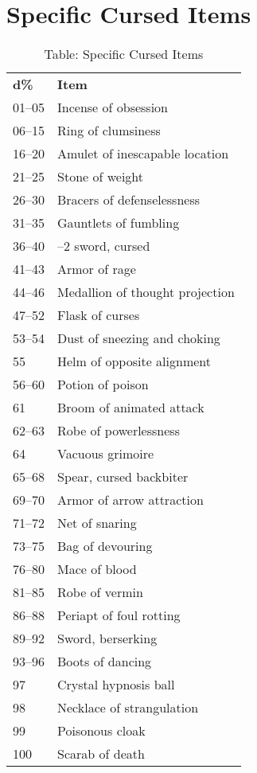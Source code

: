 \section{Specific Cursed Items}

\label{f0}
\begin{table}[]
\sffamily
\caption{Table: Specific Cursed Items}
\begin{tabular}{ll}
\textbf{d\%} & \textbf{Item}\\
01–05 & Incense of obsession \\
 06–15 & Ring of clumsiness \\
 16–20 & Amulet of inescapable location \\
 21–25 & Stone of weight \\
 26–30 & Bracers of defenselessness \\
 31–35 & Gauntlets of fumbling \\
 36–40 & –2 sword, cursed \\
 41–43 & Armor of rage \\
 44–46 & Medallion of thought projection \\
 47–52 & Flask of curses \\
 53–54 & Dust of sneezing and choking \\
 55 & Helm of opposite alignment \\
 56–60 & Potion of poison \\
 61 & Broom of animated attack \\
 62–63 & Robe of powerlessness \\
 64 & Vacuous grimoire \\
 65–68 & Spear, cursed backbiter \\
 69–70 & Armor of arrow attraction \\
 71–72 & Net of snaring \\
 73–75 & Bag of devouring \\
 76–80 & Mace of blood \\
 81–85 & Robe of vermin \\
 86–88 & Periapt of foul rotting \\
 89–92 & Sword, berserking \\
 93–96 & Boots of dancing \\
 97 & Crystal hypnosis ball \\
 98 & Necklace of strangulation \\
 99 & Poisonous cloak \\
 100 & Scarab of death\\
\end{tabular}
\end{table}

